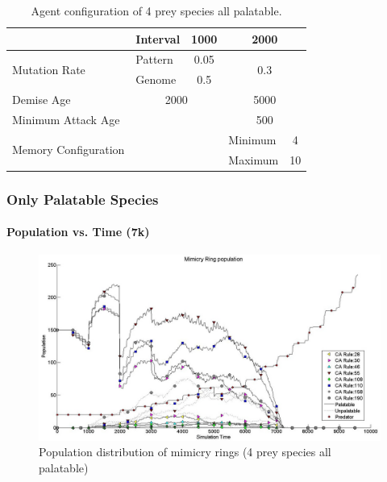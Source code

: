 {\begin{table}[H]
\begin{spacing}{1.5}
\begin{tiny}
\begin{tabular}{|l|l|c|c|l|c|}
	  						 									& Interval  & \multicolumn{2}{|c|}{1000} & \multicolumn{2}{|c|}{2000} \\ \hline
	  \multirow{2}{*}{Mutation Rate} & Pattern   & \multicolumn{2}{|c|}{0.05} & \multicolumn{2}{|c|}{\multirow{2}{*}{0.3}} \\ \cline{2-4}
	  						 									 & Genome    & \multicolumn{2}{|c|}{0.5}  & \multicolumn{2}{|c|}{} \\ \hline
	  Demise Age	 									 & \multicolumn{3}{|c|}{2000}							& \multicolumn{2}{|c|}{5000} \\ \hline
	  Minimum Attack Age						 & \multicolumn{3}{|c|}{} 						    & \multicolumn{2}{|c|}{500} \\ \hline
	  \multirow{2}{*}{Memory Configuration} & \multicolumn{3}{|c|}{} 					& Minimum & 4 \\ \cline{5-6}
	   																			& \multicolumn{3}{|c|}{} 					& Maximum & 10 \\ \hline  
	\end{tabular}
	\end{tiny}
	\end{spacing}
	\caption{Agent configuration of 4 prey species all palatable.}
	\label{tab:config-table-4-prey-palatable}
	\end{table}

}

\frame
{
	\frametitle{Only Palatable Species}
	\framesubtitle{Population vs. Time (7k)}

\begin{figure}[H]
	\centering
	\includegraphics[scale=0.25]{../tex/images/simTime10k-4Prey-p}
	\caption{Population distribution of mimicry rings (4 prey species all palatable)}
	\label{fig:plot-4-prey-p}
\end{figure}
}


